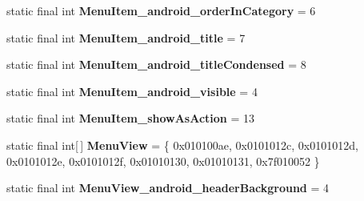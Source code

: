 \begin{DoxyCompactItemize}
\item 
\hypertarget{classandroid_1_1support_1_1v7_1_1appcompat_1_1_r_1_1styleable_aa1c0e909cd7ee99bf0a533a46cc1b7ea}{}static final int {\bfseries Menu\+Item\+\_\+android\+\_\+order\+In\+Category} = 6\label{classandroid_1_1support_1_1v7_1_1appcompat_1_1_r_1_1styleable_aa1c0e909cd7ee99bf0a533a46cc1b7ea}

\item 
\hypertarget{classandroid_1_1support_1_1v7_1_1appcompat_1_1_r_1_1styleable_ae43bb3bba8a786dc2a2b824328c9d870}{}static final int {\bfseries Menu\+Item\+\_\+android\+\_\+title} = 7\label{classandroid_1_1support_1_1v7_1_1appcompat_1_1_r_1_1styleable_ae43bb3bba8a786dc2a2b824328c9d870}

\item 
\hypertarget{classandroid_1_1support_1_1v7_1_1appcompat_1_1_r_1_1styleable_ada292a9182015c2384c05eec0475e10d}{}static final int {\bfseries Menu\+Item\+\_\+android\+\_\+title\+Condensed} = 8\label{classandroid_1_1support_1_1v7_1_1appcompat_1_1_r_1_1styleable_ada292a9182015c2384c05eec0475e10d}

\item 
\hypertarget{classandroid_1_1support_1_1v7_1_1appcompat_1_1_r_1_1styleable_aec2b017060367d3fccc7b214fd12df1b}{}static final int {\bfseries Menu\+Item\+\_\+android\+\_\+visible} = 4\label{classandroid_1_1support_1_1v7_1_1appcompat_1_1_r_1_1styleable_aec2b017060367d3fccc7b214fd12df1b}

\item 
\hypertarget{classandroid_1_1support_1_1v7_1_1appcompat_1_1_r_1_1styleable_a90bfa8cb2820ac63ee4de421e3c22817}{}static final int {\bfseries Menu\+Item\+\_\+show\+As\+Action} = 13\label{classandroid_1_1support_1_1v7_1_1appcompat_1_1_r_1_1styleable_a90bfa8cb2820ac63ee4de421e3c22817}

\item 
\hypertarget{classandroid_1_1support_1_1v7_1_1appcompat_1_1_r_1_1styleable_ab45f4f3fe3b636a3730a9fb26bfa1050}{}static final int\mbox{[}$\,$\mbox{]} {\bfseries Menu\+View} = \{ 0x010100ae, 0x0101012c, 0x0101012d, 0x0101012e, 0x0101012f, 0x01010130, 0x01010131, 0x7f010052 \}\label{classandroid_1_1support_1_1v7_1_1appcompat_1_1_r_1_1styleable_ab45f4f3fe3b636a3730a9fb26bfa1050}

\item 
\hypertarget{classandroid_1_1support_1_1v7_1_1appcompat_1_1_r_1_1styleable_a2461360be70faed4573a5a5d5119c2ae}{}static final int {\bfseries Menu\+View\+\_\+android\+\_\+header\+Background} = 4\label{classandroid_1_1support_1_1v7_1_1appcompat_1_1_r_1_1styleable_a2461360be70faed4573a5a5d5119c2ae}


\end{DoxyCompactItemize}
